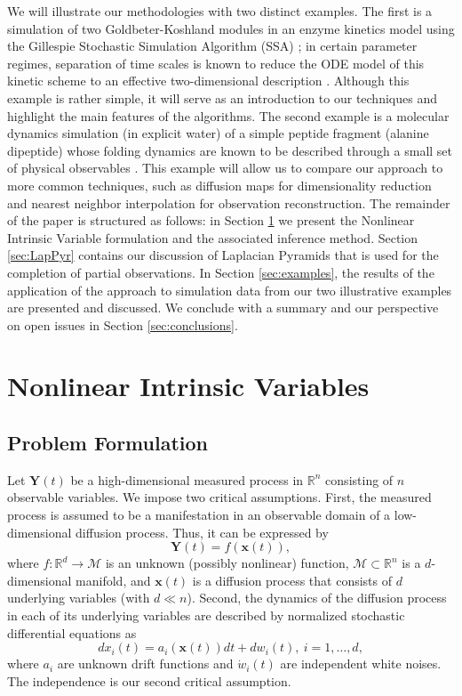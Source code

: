 We will illustrate our methodologies with two distinct examples.
%
The first is a simulation
of two Goldbeter-Koshland modules in an enzyme kinetics model using the Gillespie Stochastic Simulation
Algorithm (SSA) \cite{gillespie1977exact};
in certain parameter regimes, separation of time scales is known
to reduce the ODE model of this kinetic scheme to an effective two-dimensional description \cite{zagaris2012stability}.
%
Although this example is rather simple, it will serve as an introduction to our techniques and highlight the main features of the algorithms.
%
The second example is a molecular dynamics
simulation (in explicit water) of a simple peptide fragment (alanine dipeptide) whose folding
dynamics are known to be described through a small set of physical observables \cite{bolhuis2000reaction}.
%
This example will allow us to compare our approach to more common techniques,
such as diffusion maps \cite{coifman2005geometric} for dimensionality reduction
and nearest neighbor interpolation for observation reconstruction.
%
The remainder of the paper is structured as follows: in Section \ref{sec:NIV} we present the Nonlinear Intrinsic Variable formulation and
the associated inference method.
%
Section \ref{sec:LapPyr} contains our discussion of Laplacian Pyramids that
is used for the completion of partial observations.
%
In Section \ref{sec:examples}, the results
of the application of the approach to simulation data from our two illustrative examples are presented and discussed.
%
We conclude with a summary and our perspective on open issues in Section \ref{sec:conclusions}.

\section{Nonlinear Intrinsic Variables} \label{sec:NIV}

\subsection{Problem Formulation}
Let $\mathbf{Y}(t)$ be a high-dimensional measured process in $\mathbb{R}^n$ consisting of $n$ observable variables.
%
We impose two critical assumptions. First, the measured process is assumed to be a manifestation in an observable domain of a low-dimensional diffusion process. Thus, it can be expressed by
\begin{equation}
	\mathbf{Y}(t) = f(\mathbf{x}(t)),
\end{equation}
where $f:\mathbb{R}^d \rightarrow \mathcal{M}$ is an unknown (possibly nonlinear) function, $\mathcal{M} \subset \mathbb{R}^n$ is a $d$-dimensional manifold,
and $\mathbf{x}(t)$ is a diffusion process that consists of $d$ underlying variables (with $d \ll n$).
%
Second, the dynamics of the diffusion process in each of its underlying variables are described by normalized stochastic differential equations as
\begin{equation}
	d x_i(t) = a_i (\mathbf{x}(t)) dt + d w_i(t), \ i=1,\ldots,d,
	\label{eq:dynamics}
\end{equation}
where $a_i$ are unknown drift functions and $\dot{w}_i(t)$ are independent white noises.
%
The independence is our second critical assumption.

